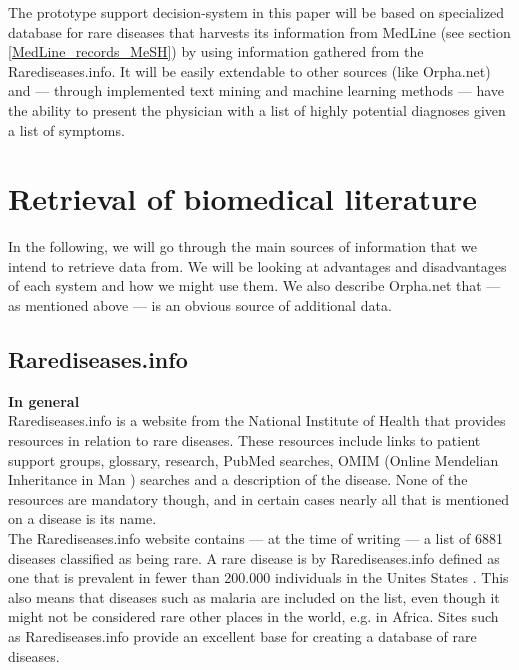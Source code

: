 The prototype support decision-system in this paper will be based on
specialized database for rare diseases that harvests its information
from MedLine (see section \ref{MedLine_records_MeSH}) by using information gathered from the
Rarediseases.info. It will be easily extendable to other sources (like
Orpha.net) and --- through implemented text mining and machine learning
methods --- have the ability to present the physician with a list of
highly potential diagnoses given a list of symptoms.

\section{Retrieval of biomedical literature}

In the following, we will go through the main sources of information
that we intend to retrieve data from. We will be looking at advantages
and disadvantages of each system and how we might use them. We also
describe Orpha.net that --- as mentioned above --- is an obvious source of
additional data.

\subsection{Rarediseases.info\label{Rarediseases_info}}

\textbf{In general} \\
Rarediseases.info is a website from the National Institute of Health
\cite{NIHOverview} that provides resources in relation to rare
diseases. These resources include links to patient support groups,
glossary, research, PubMed searches, OMIM (Online Mendelian
Inheritance in Man \cite{OMIM} )
searches and a description of the disease. None of the resources are
mandatory though, and in certain cases nearly all that is mentioned on
a disease is its name.\\

The Rarediseases.info website contains --- at the time of writing --- a list
of 6881 diseases classified as being rare. A rare disease is by
Rarediseases.info defined as one that is prevalent in fewer than
200.000 individuals in the Unites States \cite{RareDiseaseDef}. This
also means that diseases such as malaria are included on the list,
even though it might not be considered rare other places in the world,
e.g. in Africa. Sites such as Rarediseases.info provide an excellent
base for creating a database of rare diseases.\\

